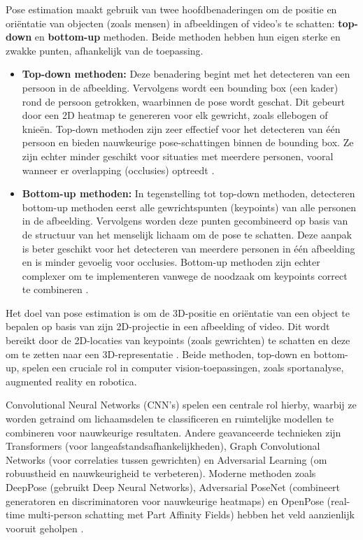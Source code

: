 \medskip

Pose estimation maakt gebruik van twee hoofdbenaderingen om de positie en oriëntatie van objecten (zoals mensen) in afbeeldingen of video's te schatten: \textbf{top-down} en \textbf{bottom-up} methoden. 
Beide methoden hebben hun eigen sterke en zwakke punten, afhankelijk van de toepassing.

\begin{itemize}
    \item \textbf{Top-down methoden:} 
    Deze benadering begint met het detecteren van een persoon in de afbeelding. 
    Vervolgens wordt een bounding box (een kader) rond de persoon getrokken, waarbinnen de pose wordt geschat. 
    Dit gebeurt door een 2D heatmap te genereren voor elk gewricht, zoals ellebogen of knieën. 
    Top-down methoden zijn zeer effectief voor het detecteren van één persoon en bieden nauwkeurige pose-schattingen binnen de bounding box. 
    Ze zijn echter minder geschikt voor situaties met meerdere personen, vooral wanneer er overlapping (occlusies) optreedt \autocite{LiuEtAl2022}.

    \item \textbf{Bottom-up methoden:} 
    In tegenstelling tot top-down methoden, detecteren bottom-up methoden eerst alle gewrichtspunten (keypoints) van alle personen in de afbeelding. 
    Vervolgens worden deze punten gecombineerd op basis van de structuur van het menselijk lichaam om de pose te schatten. 
    Deze aanpak is beter geschikt voor het detecteren van meerdere personen in één afbeelding en is minder gevoelig voor occlusies. 
    Bottom-up methoden zijn echter complexer om te implementeren vanwege de noodzaak om keypoints correct te combineren \autocite{BeomjunEtAl2022}.
\end{itemize}

Het doel van pose estimation is om de 3D-positie en oriëntatie van een object te bepalen op basis van zijn 2D-projectie in een afbeelding of video. 
Dit wordt bereikt door de 2D-locaties van keypoints (zoals gewrichten) te schatten en deze om te zetten naar een 3D-representatie \autocite{SulongEtAl2023}. 
Beide methoden, top-down en bottom-up, spelen een cruciale rol in computer vision-toepassingen, zoals sportanalyse, augmented reality en robotica.

\medskip

Convolutional Neural Networks (CNN's) spelen een centrale rol hierby, waarbij ze worden getraind om lichaamsdelen te classificeren en ruimtelijke modellen te combineren voor nauwkeurige resultaten. 
Andere geavanceerde technieken zijn Transformers (voor langeafstandsafhankelijkheden), Graph Convolutional Networks (voor correlaties tussen gewrichten) en Adversarial Learning (om robuustheid en nauwkeurigheid te verbeteren). 
Moderne methoden zoals DeepPose (gebruikt Deep Neural Networks), Adversarial PoseNet (combineert generatoren en discriminatoren voor nauwkeurige heatmaps) en OpenPose (real-time multi-person schatting met Part Affinity Fields) hebben het veld aanzienlijk vooruit geholpen \autocite{ZhaoEtAl2024}.

